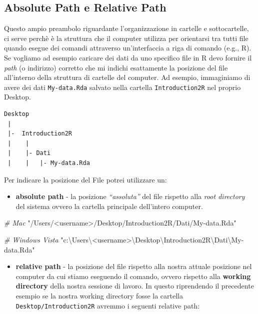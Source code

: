 \documentclass[
]{book}
\newenvironment{Shaded}{\begin{snugshade}}{\end{snugshade}}
\newcommand{\CommentTok}[1]{\textcolor[rgb]{0.56,0.35,0.01}{\textit{#1}}}
\newcommand{\StringTok}[1]{\textcolor[rgb]{0.31,0.60,0.02}{#1}}
\providecommand{\tightlist}{%
  \setlength{\itemsep}{0pt}\setlength{\parskip}{0pt}}
\begin{document}
\hypertarget{absolute-path-e-relative-path}{%
\subsection{Absolute Path e Relative Path}\label{absolute-path-e-relative-path}}

Questo ampio preambolo riguardante l'organizzazione in cartelle e sottocartelle, ci serve perchè è la struttura che il computer utilizza per orientarsi tra tutti file quando esegue dei comandi attraverso un'interfaccia a riga di comando (e.g., R). Se vogliamo ad esempio caricare dei dati da uno specifico file in R devo fornire il \emph{path} (o indirizzo) corretto che mi indichi esattamente la posizione del file all'interno della struttura di cartelle del computer. Ad esempio, immaginiamo di avere dei dati \texttt{My-data.Rda} salvato nella cartella \texttt{Introduction2R} nel proprio Desktop.

\begin{verbatim}
Desktop
 |
 |-  Introduction2R
 |    |
 |    |- Dati
 |    |   |- My-data.Rda
\end{verbatim}

Per indicare la posizione del File potrei utilizzare un:

\begin{itemize}
\tightlist
\item
  \textbf{absolute path} - la posizione \emph{``assoluta''} del file rispetto alla \emph{root directory} del sistema ovvero la cartella principale dell'intero computer.
\end{itemize}

\begin{Shaded}
\begin{Highlighting}[]
\CommentTok{# Mac}
\StringTok{"/Users/<username>/Desktop/Introduction2R/Dati/My-data.Rda"}

\CommentTok{# Windows Vista}
\StringTok{"c:\textbackslash{}Users\textbackslash{}<username>\textbackslash{}Desktop\textbackslash{}Introduction2R\textbackslash{}Dati\textbackslash{}My-data.Rda"}
\end{Highlighting}
\end{Shaded}

\begin{itemize}
\tightlist
\item
  \textbf{relative path} - la posizione del file rispetto alla nostra attuale posizione nel computer da cui stiamo eseguendo il comando, ovvero rispetto alla \textbf{working directory} della nostra sessione di lavoro. In questo riprendendo il precedente esempio se la nostra working directory fosse la cartella \texttt{Desktop/Introduction2R} avremmo i seguenti relative path:
\end{itemize}
\end{document}
